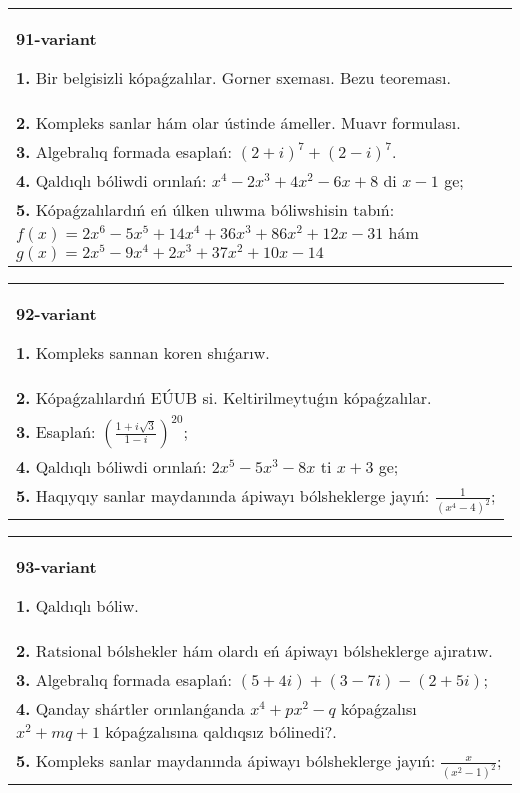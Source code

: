 \documentclass{article}
\begin{document}
\begin{tabular}{m{17cm}}
\textbf{91-variant}
\newline

\textbf{1.} Bir belgisizli kópaǵzalılar. Gorner sxeması. Bezu teoreması.  \\
\textbf{2.} Kompleks sanlar hám olar ústinde ámeller. Muavr formulası.  \\
\textbf{3.} Algebralıq formada esaplań: $(2+i)^7+(2-i)^7$. \\
\textbf{4.} Qaldıqlı bóliwdi orınlań: $x^4-2 x^3+4 x^2-6 x+8$ di $x-1$ ge; \\
\textbf{5.} Kópaǵzalılardıń eń úlken ulıwma bóliwshisin tabıń:  $f(x)=2 x^6-5 x^5+14 x^4+36 x^3+86 x^2+12 x-31$ hám $g(x)=2 x^5-9 x^4+2 x^3+37 x^2+10 x-14$ \\

\end{tabular}
\vspace{1cm}


\begin{tabular}{m{17cm}}
\textbf{92-variant}
\newline

\textbf{1.} Kompleks sannan koren shıǵarıw. \\
\textbf{2.} Kópaǵzalılardıń EÚUB si. Keltirilmeytuǵın   kópaǵzalılar. \\
\textbf{3.} Esaplań:  $\left(\frac{1+i \sqrt{3}}{1-i}\right)^{20}$; \\
\textbf{4.} Qaldıqlı bóliwdi orınlań: $2 x^5-5 x^3-8 x$ ti $x+3$ ge; \\
\textbf{5.} Haqıyqıy sanlar maydanında ápiwayı bólsheklerge jayıń:  $\frac{1}{\left(x^4-4\right)^2}$; \\

\end{tabular}
\vspace{1cm}


\begin{tabular}{m{17cm}}
\textbf{93-variant}
\newline

\textbf{1.} Qaldıqlı bóliw.  \\
\textbf{2.} Ratsional bólshekler hám olardı eń ápiwayı bólsheklerge ajıratıw. \\
\textbf{3.} Algebralıq formada esaplań: $(5+4 i)+(3-7 i)-(2+5 i)$; \\
\textbf{4.} Qanday shártler orınlanǵanda $x^4+p x^2-q$ kópaǵzalısı $x^2+m q+1$ kópaǵzalısına qaldıqsız bólinedi?. \\
\textbf{5.} Kompleks sanlar maydanında ápiwayı bólsheklerge jayıń: $\frac{x}{\left(x^2-1\right)^2}$; \\

\end{tabular}
\vspace{1cm}
\end{document}
